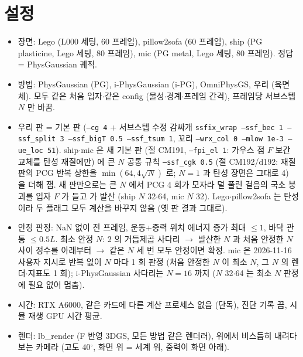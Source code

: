\section*{설정}
\begin{itemize}
\item 장면: Lego (L000 세팅, 60 프레임), pillow2sofa (60 프레임), ship (PG plasticine, Lego 세팅, 80 프레임), mic (PG metal, Lego 세팅, 80 프레임). 정답 = PhysGaussian 궤적.
\item 방법: PhysGaussian (PG), i-PhysGaussian (i-PG), OmniPhysGS, 우리 (육면체). 모두 같은 처음 입자$\cdot$같은 config (물성$\cdot$경계$\cdot$프레임 간격), 프레임당 서브스텝 $N$ 만 바꿈.
\item 우리 판 = 기본 판 (\texttt{--cg 4} + 서브스텝 수정 감싸개 \texttt{ssfix\_wrap --ssf\_bec 1 --ssf\_split 3 --ssf\_bigT 0.5 --ssf\_tsum 1}, 꼬리 \texttt{--wrx\_col 0 --mlow 1e-3 --ue\_loc 51}). ship$\cdot$mic 은 새 기본 판 (절 CM191, \texttt{--fpi\_el 1}: 가우스 점 $F$ 보간 교체를 탄성 재질에만) 에 큰 $N$ 공통 규칙 \texttt{--ssf\_cgk 0.5} (절 CM192/d192: 재질 판의 PCG 반복 상한을 $\min(64, 4\sqrt{N})$ 로; $N{=}1$ 과 탄성 장면은 그대로 4) 을 더해 잼. 새 판만으로는 큰 $N$ 에서 PCG 4 회가 모자라 덜 풀린 걸음의 국소 붕괴를 입자 $F$ 가 들고 가 발산 (ship $N$ 32$\cdot$64, mic $N$ 32). Lego$\cdot$pillow2sofa 는 탄성이라 두 플래그 모두 계산을 바꾸지 않음 (옛 판 결과 그대로).
\item 안정 판정: NaN 없이 전 프레임, 운동+중력 위치 에너지 증가 최대 $\le 1$, 바닥 관통 $\le 0.5L$. 최소 안정 $N$: 2 의 거듭제곱 사다리 $\to$ 발산한 $N$ 과 처음 안정한 $N$ 사이 정수를 아래부터 $\to$ 같은 $N$ 세 번 모두 안정이면 확정. mic 은 2026-11-16 사용자 지시로 반복 없이 $N$ 마다 1 회 판정 (처음 안정한 $N$ 이 최소 $N$, 그 $N$ 의 렌더$\cdot$지표도 1 회); i-PhysGaussian 사다리는 $N{=}16$ 까지 ($N$ 32$\cdot$64 는 최소 $N$ 판정에 필요 없어 멈춤).
\item 시간: RTX A6000, 같은 카드에 다른 계산 프로세스 없음 (단독), 진단 기록 끔, 시뮬 재생 GPU 시간 평균.
\item 렌더: lb\_render (F 반영 3DGS, 모든 방법 같은 렌더러), 위에서 비스듬히 내려다보는 카메라 (고도 40$^\circ$, 화면 위 = 세계 위, 중력이 화면 아래).
\end{itemize}
